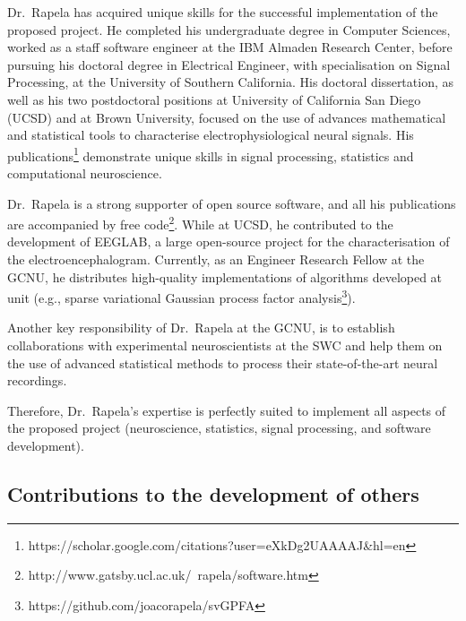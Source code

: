 Dr.~Rapela has acquired unique skills for the successful implementation of the
proposed project. He completed his undergraduate degree in Computer Sciences,
worked as a staff software engineer at the IBM Almaden Research Center, before
pursuing his doctoral degree in Electrical Engineer, with specialisation on
Signal Processing, at the University of Southern California.  His doctoral
dissertation, as well as his two postdoctoral positions at University of
California San Diego (UCSD) and at Brown University, focused on the use of
advances mathematical and statistical tools to characterise
electrophysiological neural signals. His
publications\footnote{https://scholar.google.com/citations?user=eXkDg2UAAAAJ\&hl=en}
demonstrate unique skills in signal processing, statistics and computational
neuroscience.

Dr.~Rapela is a strong supporter of open source software, and all his
publications are accompanied by free
code\footnote{http://www.gatsby.ucl.ac.uk/~rapela/software.htm}. While at UCSD,
he contributed to the development of EEGLAB, a large open-source project for
the characterisation of the electroencephalogram. Currently, as an Engineer
Research Fellow at the GCNU, he distributes high-quality implementations of
algorithms developed at unit (e.g., sparse variational Gaussian process factor
analysis\footnote{https://github.com/joacorapela/svGPFA}).

Another key responsibility of Dr.~Rapela at the GCNU, is to establish
collaborations with experimental neuroscientists at the SWC and help them on
the use of advanced statistical methods to process their state-of-the-art
neural recordings.

Therefore, Dr.~Rapela's expertise is perfectly suited to implement all aspects
of the
proposed project (neuroscience, statistics, signal processing, and software development).


\subsection{Contributions to the development of others}

